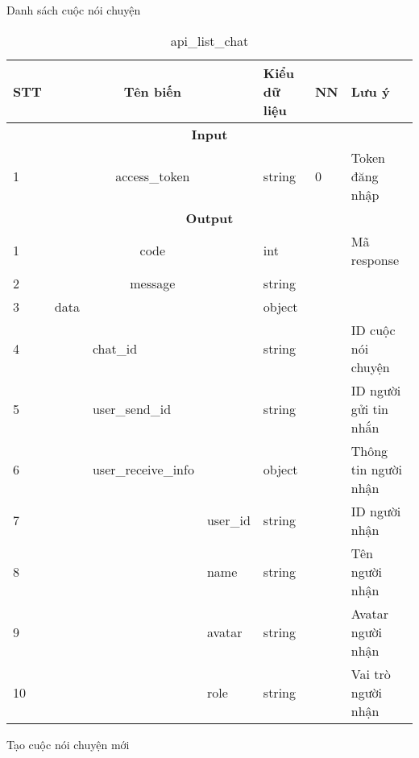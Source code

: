 \documentclass[../DoAn.tex]{subfiles}
\begin{document}
Danh sách cuộc nói chuyện
    \begin{longtable}{| p{} | p{}| p{} | p{} |p{} | p{}| p{} |  } 
    \caption{api\_list\_chat}
    \label{banga35}
    \endfirsthead
    \endhead
    \hline
    \bfseries STT & \multicolumn{3}{c|}{\bfseries Tên biến}& \bfseries Kiểu dữ liệu &\bfseries NN &\bfseries Lưu ý\\\hline
    \multicolumn{7}{|c|}{\bfseries Input}\\\hline
    1  & \multicolumn{3}{c|}{access\_token}& string & 0 & Token đăng nhập\\\hline
    \multicolumn{7}{|c|}{\bfseries Output}\\\hline
    1  & \multicolumn{3}{c|}{code}& int &  & Mã response\\\hline
    2  & \multicolumn{3}{c|}{message}& string &  & \\\hline
    3  & data & & & object &  & \\\cline{1-1}\cline{3-7}
    4  & \multirow{10}{*}{}    & chat\_id & & string &  & ID cuộc nói chuyện\\\cline{1-1}\cline{3-7}
    5 &      &  user\_send\_id    &  & string &  & ID người gửi tin nhắn\\\cline{1-1}\cline{3-7}
    6 &      &  user\_receive\_info   &  & object &  & Thông tin người nhận\\\cline{1-1}\cline{4-7}
    7 &      &      & user\_id & string &  & ID người nhận\\\cline{1-1}\cline{4-7}
    8 &      &      & name & string &  & Tên người nhận\\\cline{1-1}\cline{4-7}
    9 &      &      & avatar & string &  & Avatar người nhận\\\cline{1-1}\cline{4-7}
    10 &      &      & role & string &  & Vai trò người nhận\\\hline
    \end{longtable}
\newpage
Tạo cuộc nói chuyện mới
    \tabletail{\hline}
    \label{banga36}
\end{document}
